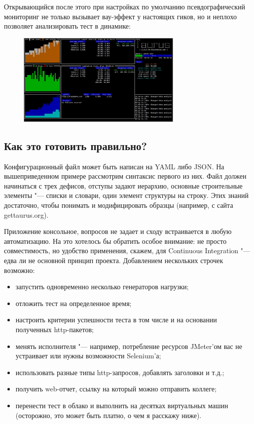 \documentclass[10pt, a5paper]{article}
\begin{document}

Открывающийся после этого при настройках по умолчанию псевдографический мониторинг не только вызывает вау-эффект у настоящих гиков, но и неплохо позволяет анализировать тест в динамике:

\begin{figure}[h!]
  \centering
  \includegraphics[height=4.5cm]{15_2016_Svirinovski1.png}
\end{figure}

\subsection*{Как это готовить правильно?}

Конфигурационный файл может быть написан на YAML либо JSON. На вышеприведенном примере рассмотрим синтаксис первого из них. Файл должен начинаться с трех дефисов, отступы задают иерархию, основные строительные элементы "--- списки и словари, один элемент структуры на строку. Этих знаний достаточно, чтобы понимать и модифицировать образцы (например, с сайта gettaurus.org).

Приложение консольное, вопросов не задает и сходу встраивается в любую автоматизацию. На это хотелось бы обратить особое внимание: не просто совместимость, но удобство применения, скажем, для Continuous Integration "--- едва ли не основной принцип проекта. Добавлением нескольких строчек возможно:

\begin{itemize}
  \item запустить одновременно несколько генераторов нагрузки;
  \item отложить тест на определенное время;
  \item настроить критерии успешности теста в том числе и на основании полученных http-пакетов;
  \item менять исполнителя "--- например, потребление ресурсов \linebreak JMeter’ом вас не устраивает или нужны возможности \linebreak Selenium’а;
  \item использовать разные типы http-запросов, добавлять заголовки и т.д.;
  \item получить web-отчет, ссылку на который можно отправить коллеге;
  \item перенести тест в облако и выполнить на десятках виртуальных машин (осторожно, это может быть платно, о чем я расскажу ниже).
\end{itemize}
\end{document}
